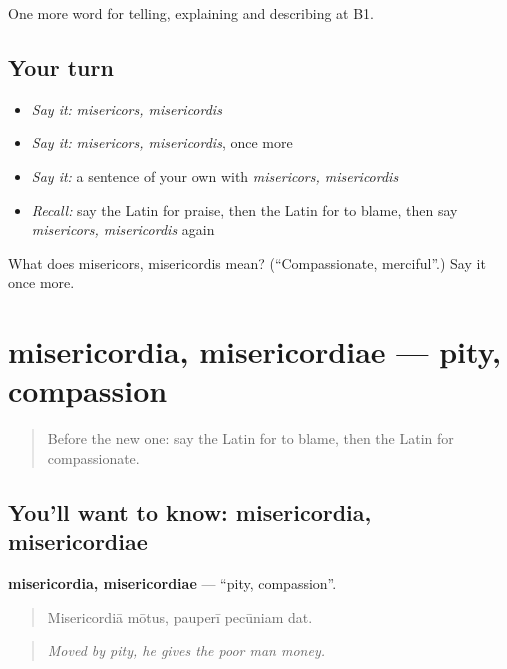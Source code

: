 \begin{grammarlens}[title={What you've built}]
One more word for telling, explaining and describing at B1.
\end{grammarlens}

\subsection*{Your turn}
\begin{itemize}
\raggedright
  \item \emph{Say it:} \emph{misericors, misericordis}
  \item \emph{Say it:} \emph{misericors, misericordis}, once more
  \item \emph{Say it:} a sentence of your own with \emph{misericors, misericordis}
  \item \emph{Recall:} say the Latin for praise, then the Latin for to blame, then say \emph{misericors, misericordis} again
\end{itemize}

\begin{tcolorbox}[breakable,colback=teal!4,colframe=teal!35!black,title={Before you move on}]
What does misericors, misericordis mean? (\textquotedblleft{}Compassionate, merciful\textquotedblright{}.) Say it once more.
\end{tcolorbox}
\section[misericordia, misericordiae]{misericordia, misericordiae — pity, compassion}

\label{lesson:LA-C513-misericordia}



\begin{quote}
Before the new one: say the Latin for to blame, then the Latin for compassionate.
\end{quote}

\subsection*{You'll want to know: misericordia, misericordiae}
\textbf{misericordia, misericordiae} — \textquotedblleft{}pity, compassion\textquotedblright{}.

\begin{quote}
Misericordiā mōtus, pauperī pecūniam dat.
\end{quote}

\begin{quote}
\emph{Moved by pity, he gives the poor man money.}
\end{quote}

